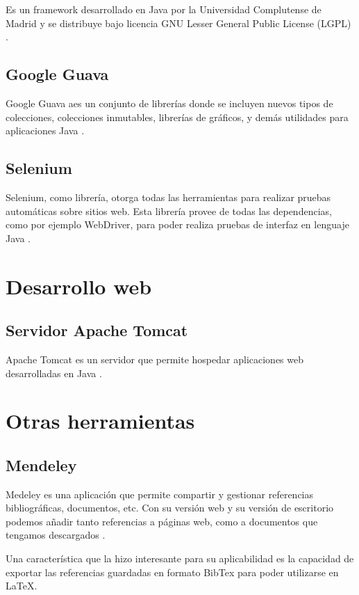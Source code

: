 Es un framework desarrollado en Java por la Universidad Complutense de Madrid y se distribuye bajo licencia GNU Lesser General Public License (LGPL) \cite{colibri:frame}.

\subsection{Google Guava}

Google Guava aes un conjunto de librerías donde se incluyen nuevos tipos de colecciones, colecciones inmutables, librerías de gráficos, y demás utilidades para aplicaciones Java \cite{guava:lib}.

\subsection{Selenium}

Selenium, como librería, otorga todas las herramientas para realizar pruebas automáticas sobre sitios web. Esta librería provee de todas las dependencias, como por ejemplo WebDriver, para poder realiza pruebas de interfaz en lenguaje Java \cite{sel:lib}.


\section{Desarrollo web}

\subsection{Servidor Apache Tomcat}

Apache Tomcat es un servidor que permite hospedar aplicaciones web desarrolladas en Java \cite{tomcat:wiki}.

\section{Otras herramientas}

\subsection{Mendeley}

Medeley es una aplicación que permite compartir y gestionar referencias bibliográficas, documentos, etc. Con su versión web y su versión de escritorio podemos añadir tanto referencias a páginas web, como a documentos que tengamos descargados \cite{mende:wiki}.

Una característica que la hizo interesante para su aplicabilidad es la capacidad de exportar las referencias guardadas en formato BibTex para poder utilizarse en LaTeX.
